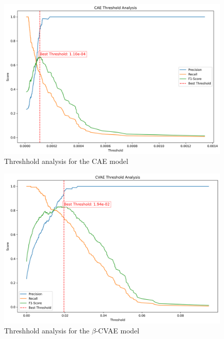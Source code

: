 \begin{figure}[!h]
  \centering
  \includegraphics[scale=0.5]{figures/anomalies/cae/threshold.png}
  \caption{Threshhold analysis for the CAE model}
  \label{fig:threshold_cae}
\end{figure}

\begin{figure}[!h]
  \centering
  \includegraphics[scale=0.5]{figures/anomalies/cvae/threshold.png}
  \caption{Threshhold analysis for the $\beta$-CVAE model}
  \label{fig:threshold_vae}
\end{figure}